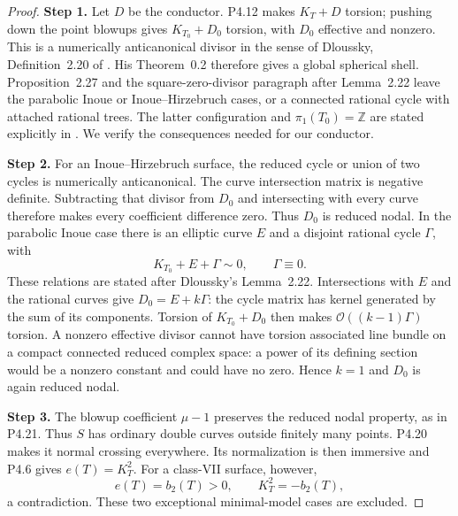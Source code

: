 \begin{proof}
\noindent\textbf{Step 1.} Let $D$ be the conductor. P4.12 makes $K_T+D$ torsion;
pushing down the point blowups gives $K_{T_0}+D_0$ torsion,
with $D_0$ effective and nonzero. This is a numerically
anticanonical divisor in the sense of Dloussky,
Definition~2.20 of \cite{Dloussky2006}. His Theorem~0.2
therefore gives a global spherical shell. Proposition~2.27
and the square-zero-divisor paragraph after Lemma~2.22
leave the parabolic Inoue or Inoue--Hirzebruch cases,
or a connected rational cycle with attached rational
trees. The latter configuration and $\pi_1(T_0)=\mathbb Z$
are stated explicitly in \cite[\S1, pp.~284--285]{DOT2003}.
We verify the consequences needed
for our conductor.

\noindent\textbf{Step 2.} For an Inoue--Hirzebruch surface, the reduced cycle or
union of two cycles is numerically anticanonical. The
curve intersection matrix is negative definite. Subtracting
that divisor from $D_0$ and intersecting with every curve
therefore makes every coefficient difference zero.
Thus $D_0$ is reduced nodal. In the parabolic Inoue case
there is an elliptic curve $E$ and a disjoint rational
cycle $\Gamma$, with
\[
 K_{T_0}+E+\Gamma\sim0,\qquad \Gamma\equiv0.
\]
These relations are stated after Dloussky's Lemma~2.22.
Intersections with $E$ and the rational curves give
$D_0=E+k\Gamma$: the cycle matrix has kernel generated
by the sum of its components. Torsion of $K_{T_0}+D_0$
then makes $\mathcal O((k-1)\Gamma)$ torsion. A nonzero
effective divisor cannot have torsion associated line
bundle on a compact connected reduced complex space:
a power of its defining section would be a nonzero
constant and could have no zero. Hence $k=1$ and
$D_0$ is again reduced nodal.

\noindent\textbf{Step 3.} The blowup coefficient $\mu-1$ preserves the reduced
nodal property, as in P4.21. Thus $S$ has ordinary
double curves outside finitely many points. P4.20
makes it normal crossing everywhere. Its normalization
is then immersive and P4.6 gives $e(T)=K_T^2$.
For a class-VII surface, however,
\[
 e(T)=b_2(T)>0,\qquad K_T^2=-b_2(T),
\]
a contradiction. These two exceptional minimal-model
cases are excluded.


\end{proof}
